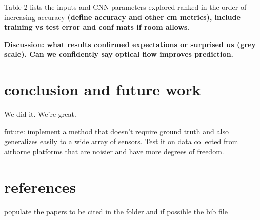 \documentclass{article}
\begin{document}
Table 2 lists the inputs and CNN parameters explored ranked in the order of increasing accuracy \textbf{(define accuracy and other cm metrics), include training vs test error and conf mats if room allows}.  

 \textbf{Discussion: what results confirmed expectations or surprised us (grey scale). Can we confidently say optical flow improves prediction. }

\section{conclusion and future work}
We did it. We're great.

future: implement a method that doesn't require ground truth and also generalizes easily to a wide array of sensors. Test it on data collected from airborne platforms that are noisier and have more degrees of freedom.  



\section{references}
populate the papers to be cited in the folder and if possible the bib file




\end{document}
